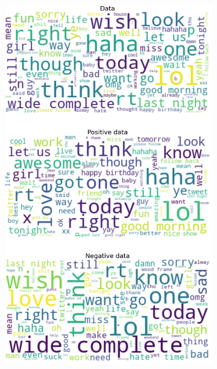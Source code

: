 \documentclass{article}
\begin{document}
\begin{itemize}
\begin{figure}[H]
\begin{subfigure}[b]{0.24\textwidth}
      \includegraphics[width=\textwidth]{chapter-06/section-01-01/17/visualization/3/wordcloud.png}
    \end{subfigure}
    \begin{subfigure}[b]{0.24\textwidth}
      \centering

\end{subfigure}
\end{figure}
\end{itemize}
\end{document}
